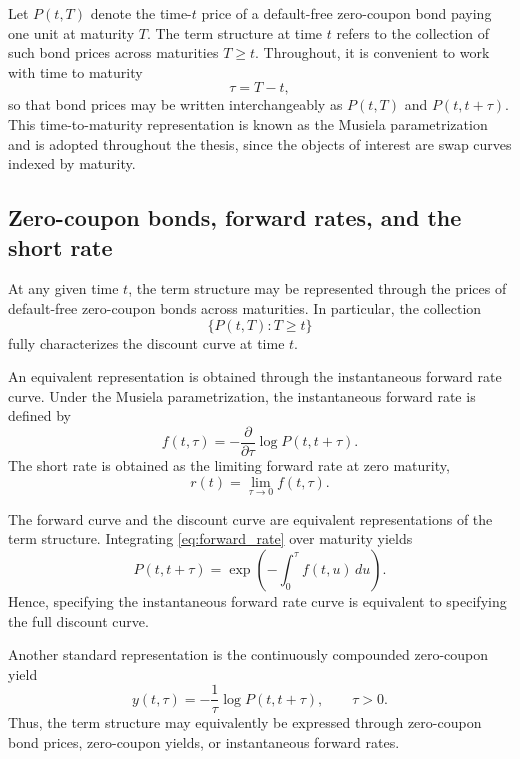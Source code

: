 Let $P(t,T)$ denote the time-$t$ price of a default-free zero-coupon bond paying one unit at maturity $T$. The term structure at time $t$ refers to the collection of such bond prices across maturities $T \ge t$. Throughout, it is convenient to work with time to maturity
\[
\tau = T-t,
\]
so that bond prices may be written interchangeably as $P(t,T)$ and $P(t,t+\tau)$. This time-to-maturity representation is known as the Musiela parametrization and is adopted throughout the thesis, since the objects of interest are swap curves indexed by maturity.

\subsection{Zero-coupon bonds, forward rates, and the short rate}

At any given time $t$, the term structure may be represented through the prices of default-free zero-coupon bonds across maturities. In particular, the collection
\[
\{P(t,T): T \ge t\}
\]
fully characterizes the discount curve at time $t$.

An equivalent representation is obtained through the instantaneous forward rate curve. Under the Musiela parametrization, the instantaneous forward rate is defined by
\begin{equation}
f(t,\tau)
=
-
\frac{\partial}{\partial \tau}
\log P(t,t+\tau).
\label{eq:forward_rate}
\end{equation}
The short rate is obtained as the limiting forward rate at zero maturity,
\begin{equation}
r(t)
=
\lim_{\tau\to0} f(t,\tau).
\label{eq:short_rate}
\end{equation}

The forward curve and the discount curve are equivalent representations of the term structure. Integrating \eqref{eq:forward_rate} over maturity yields
\begin{equation}
P(t,t+\tau)
=
\exp\!\left(
-\int_0^\tau f(t,u)\,du
\right).
\label{eq:discount_from_forward}
\end{equation}
Hence, specifying the instantaneous forward rate curve is equivalent to specifying the full discount curve.

Another standard representation is the continuously compounded zero-coupon yield
\begin{equation}
y(t,\tau)
=
-\frac{1}{\tau}\log P(t,t+\tau), \qquad \tau>0.
\label{eq:zero_yield}
\end{equation}
Thus, the term structure may equivalently be expressed through zero-coupon bond prices, zero-coupon yields, or instantaneous forward rates.

